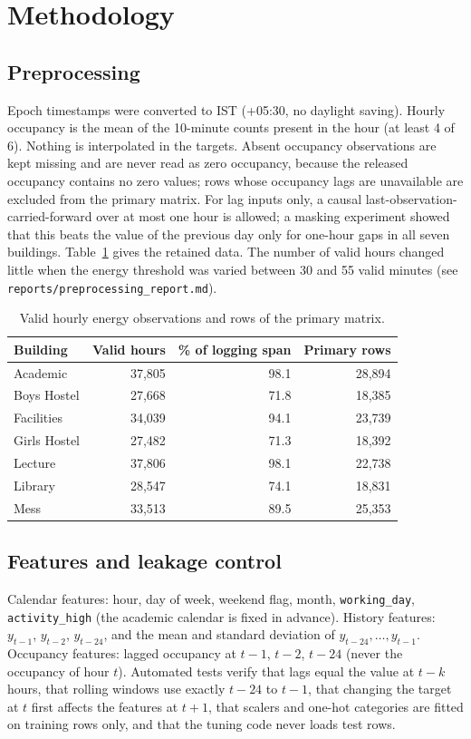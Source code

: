 \documentclass[conference]{IEEEtran}
\begin{document}
\section{Methodology}
\subsection{Preprocessing}
Epoch timestamps were converted to IST (+05:30, no daylight saving). Hourly occupancy is the mean of the 10-minute counts present in the hour (at least 4 of 6). Nothing is interpolated in the targets.
Absent occupancy observations are kept missing and are never read as zero occupancy, because the released occupancy contains no zero values; rows whose occupancy lags are unavailable are excluded
from the primary matrix. For lag inputs only, a causal last-observation-carried-forward over at most one hour is allowed; a masking experiment showed that this beats the value of the previous day only for one-hour gaps in all seven buildings.
Table~\ref{tab:cov} gives the retained data. The number of valid hours changed little when the energy threshold was varied between 30 and 55 valid minutes (see \texttt{reports/preprocessing\_report.md}).

\begin{table}[t]
\caption{Valid hourly energy observations and rows of the primary matrix.}\label{tab:cov}
\centering\small
\begin{tabular}{lrrr}
\toprule
Building & Valid hours & \% of logging span & Primary rows\\
\midrule
Academic & 37{,}805 & 98.1 & 28{,}894 \\
Boys Hostel & 27{,}668 & 71.8 & 18{,}385 \\
Facilities & 34{,}039 & 94.1 & 23{,}739 \\
Girls Hostel & 27{,}482 & 71.3 & 18{,}392 \\
Lecture & 37{,}806 & 98.1 & 22{,}738 \\
Library & 28{,}547 & 74.1 & 18{,}831 \\
Mess & 33{,}513 & 89.5 & 25{,}353 \\
\bottomrule
\end{tabular}
\end{table}

\subsection{Features and leakage control}
Calendar features: hour, day of week, weekend flag, month, \texttt{working\_day}, \texttt{activity\_high} (the academic calendar is fixed in advance). History features:
$y_{t-1}$, $y_{t-2}$, $y_{t-24}$, and the mean and standard deviation of $y_{t-24},\dots,y_{t-1}$. Occupancy features: lagged occupancy at $t-1$, $t-2$, $t-24$ (never the occupancy of hour $t$).
Automated tests verify that lags equal the value at $t-k$ hours, that rolling windows use exactly $t-24$ to $t-1$, that changing the target at $t$ first affects the features at $t+1$, that scalers and one-hot categories are fitted on training rows only,
and that the tuning code never loads test rows.
\end{document}
